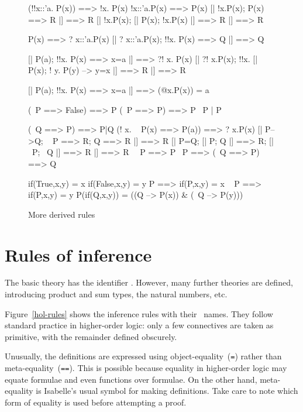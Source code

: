 \begin{figure}
\begin{ttbox}\makeatother
{}      (!!x::'a. P(x)) ==> !x. P(x)
      !x::'a.P(x) ==> P(x)
      [| !x.P(x);  P(x) ==> R |] ==> R
  [| !x.P(x);  [| P(x); !x.P(x) |] ==> R |] ==> R

       P(x) ==> ? x::'a.P(x)
       [| ? x::'a.P(x); !!x. P(x) ==> Q |] ==> Q

      [| P(a);  !!x. P(x) ==> x=a |] ==> ?! x. P(x)
      [| ?! x.P(x);  !!x. [| P(x);  ! y. P(y) --> y=x |] ==> R 
          |] ==> R

  [| P(a);  !!x. P(x) ==> x=a |] ==> (@x.P(x)) = a

             (~P ==> False) ==> P
          (~P ==> P) ==> P
    ~P | P

    (~Q ==> P) ==> P|Q
      (! x. ~ P(x) ==> P(a)) ==> ? x.P(x)
     [| P-->Q; ~ P ==> R; Q ==> R |] ==> R
     [| P=Q;  [| P; Q |] ==> R;  [| ~P; ~Q |] ==> R |] ==> R
   ~~P ==> P
      ~P ==> (~Q ==> P) ==> Q

    if(True,x,y) = x
   if(False,x,y) = y
       P ==> if(P,x,y) = x
   ~ P ==> if(P,x,y) = y
  P(if(Q,x,y)) = ((Q --> P(x)) & (~Q --> P(y)))
\end{ttbox}
\caption{More derived rules} \label{hol-lemmas2}
\end{figure}


\section{Rules of inference}
The basic theory has the {\ML} identifier .  However,
many further theories are defined, introducing product and sum types, the
natural numbers, etc.

Figure~\ref{hol-rules} shows the inference rules with their~{\ML} names.
They follow standard practice in higher-order logic: only a few connectives
are taken as primitive, with the remainder defined obscurely.  

Unusually, the definitions are expressed using object-equality~({\tt=})
rather than meta-equality~({\tt==}).  This is possible because equality in
higher-order logic may equate formulae and even functions over formulae.
On the other hand, meta-equality is Isabelle's usual symbol for making
definitions.  Take care to note which form of equality is used before
attempting a proof.

